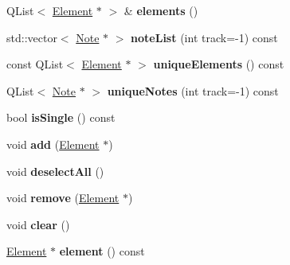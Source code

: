\begin{DoxyCompactItemize}
Q\+List$<$ \hyperlink{class_ms_1_1_element}{Element} $\ast$ $>$ \& {\bfseries elements} ()
\item 
\mbox{\label{class_ms_1_1_selection_acb1497cbea90aadadfdfe9d21067e878}} 
std\+::vector$<$ \hyperlink{class_ms_1_1_note}{Note} $\ast$ $>$ {\bfseries note\+List} (int track=-\/1) const
\item 
\mbox{\label{class_ms_1_1_selection_a10222c86689ca16007f4cd453cad3080}} 
const Q\+List$<$ \hyperlink{class_ms_1_1_element}{Element} $\ast$ $>$ {\bfseries unique\+Elements} () const
\item 
\mbox{\label{class_ms_1_1_selection_ab7dbb86a141b680f3c0006bdd415463b}} 
Q\+List$<$ \hyperlink{class_ms_1_1_note}{Note} $\ast$ $>$ {\bfseries unique\+Notes} (int track=-\/1) const
\item 
\mbox{\label{class_ms_1_1_selection_a38ebdcd0c523014365b5c0855f9e3d80}} 
bool {\bfseries is\+Single} () const
\item 
\mbox{\label{class_ms_1_1_selection_a753b2a15f85c00694be997289b1b9c63}} 
void {\bfseries add} (\hyperlink{class_ms_1_1_element}{Element} $\ast$)
\item 
\mbox{\label{class_ms_1_1_selection_a7f2dd08381be2fdbc93236ad99b0cf13}} 
void {\bfseries deselect\+All} ()
\item 
\mbox{\label{class_ms_1_1_selection_a4e5346c014b21425ba2ef41c0274930b}} 
void {\bfseries remove} (\hyperlink{class_ms_1_1_element}{Element} $\ast$)
\item 
\mbox{\label{class_ms_1_1_selection_ac18d573f336887e1e49ba15a15f6d016}} 
void {\bfseries clear} ()
\item 
\mbox{\label{class_ms_1_1_selection_abf55316b1de3db4e71efba968ec280f6}} 
\hyperlink{class_ms_1_1_element}{Element} $\ast$ {\bfseries element} () const
\item 
\mbox{\label{class_ms_1_1_selection_aea1e4edf21f0addfb0fd77042b86a9f9}} 

\end{DoxyCompactItemize}

